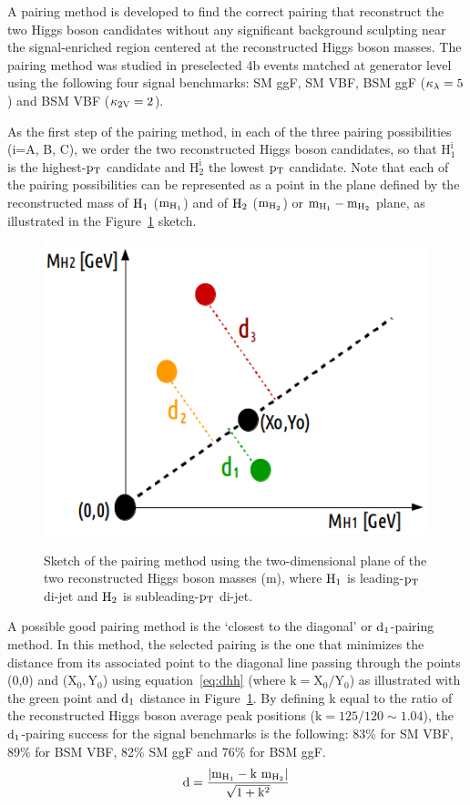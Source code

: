 A pairing method is developed to find the correct pairing that reconstruct the two Higgs boson candidates without any significant background sculpting near the signal-enriched region centered at the reconstructed Higgs boson masses. The pairing method was studied in preselected 4b events matched at generator level using the following four signal benchmarks: SM ggF, SM VBF, BSM ggF ($\kappa_{\lambda}=5$) and BSM VBF ($\mathrm{\kappa_{2V} }=2$).

As the first step of the pairing method, in each of the three pairing possibilities (i=A, B, C), we order the two reconstructed Higgs boson candidates, so that $\mathrm{H_1^{i}}$ is the highest-$\mathrm{p_{T}}$ candidate and $\mathrm{H_2^{i}}$ the lowest $\mathrm{p_{T}}$ candidate. Note that each of the pairing possibilities can be represented as a point in the plane defined by the reconstructed mass of $\mathrm{H_{1}}$ ($\mathrm{m_{H_{1}}}$) and of $\mathrm{H_{2}}$ ($\mathrm{m_{H_{2}}}$) or $\mathrm{m_{H_{1}}}-\mathrm{m_{H_{2}}}$ plane, as illustrated in the Figure~\ref{event_selection:fig:pairing} sketch. 

\begin{figure}[htb]
\begin{center}
\includegraphics[width=0.5\linewidth]{Figures/AnalysisStrategy/eventselection/pairing/new.png}\\
\end{center}
\vspace{-0.5cm}
\caption[Sketch of the pairing method using the two-dimensional plane of the two reconstructed Higgs boson masses]{Sketch of the pairing method using the two-dimensional plane of the two reconstructed Higgs boson masses (m), where $\mathrm{H_{1}}$ is leading-$\mathrm{p_{T}}$ di-jet and  $\mathrm{H_{2}}$ is subleading-$\mathrm{p_{T}}$ di-jet.}
\label{event_selection:fig:pairing}
\end{figure}

A possible good pairing method is the `closest to the diagonal' or $\mathrm{d_{1}}$-pairing method. In this method, the selected pairing is the one that minimizes the distance from its associated point to the diagonal line passing through the points (0,0) and ($\mathrm{X_{0},Y_{0}}$) using equation~\ref{eq:dhh} (where $\mathrm{k=X_{0}/Y_{0}}$) as illustrated with the green point and $\mathrm{d_{1}}$ distance in Figure~\ref{event_selection:fig:pairing}. By defining k equal to the ratio of the reconstructed Higgs boson average peak positions ($\mathrm{k}=125/120\sim1.04$), the $\mathrm{d_{1}}$-pairing success for the signal benchmarks is the following: 83\% for SM VBF, 89\% for BSM VBF, 82\% SM ggF and 76\% for BSM ggF. 
\begin{equation}
\label{eq:dhh}
\mathrm{ d = \frac{ | \mathrm{m_{H_{1}}} - k~\mathrm{m_{H_{2}}} | }{ \sqrt{ 1 + k ^{2} } }}
\end{equation}

